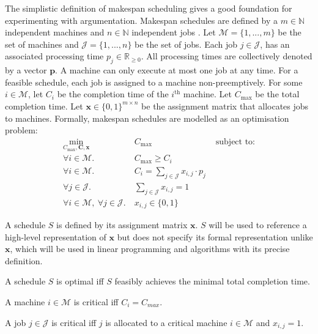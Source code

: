 The simplistic definition of makespan scheduling gives a good foundation for experimenting with argumentation. Makespan schedules are defined by a $m\in\mathbb{N}$ independent machines and $n\in\mathbb{N}$ independent jobs \cite{sa}. Let $\mathcal{M}=\{1,...,m\}$ be the set of machines and $\mathcal{J}=\{1,...,n\}$ be the set of jobs. Each job $j\in\mathcal{J}$, has an associated processing time $p_j\in\mathbb{R}_{\geq 0}$. All processing times are collectively denoted by a vector $\mathbf{p}$. A machine can only execute at most one job at any time. For a feasible schedule, each job is assigned to a machine non-preemptively. For some $i\in\mathcal{M}$, let $C_i$ be the completion time of the $i^\text{th}$ machine. Let $C_{\max}$ be the total completion time. Let $\mathbf{x}\in\{0,1\}^{m\times n}$ be the assignment matrix that allocates jobs to machines. Formally, makespan schedules are modelled as an optimisation problem:
\begin{align*}
	\min_{C_{\max},\mathbf{C},\mathbf{x}}\ &C_{\max}&\text{ subject to:}\\
	\forall i\in\mathcal{M}.\ &C_{\max}\geq C_i\\
	\forall i\in\mathcal{M}.\ &C_i=\sum_{j\in\mathcal{J}}x_{i,j}\cdot p_j\\
	\forall j\in\mathcal{J}.\ &\sum_{j\in\mathcal{J}}x_{i,j}=1\\
	\forall i\in\mathcal{M},\ \forall j\in\mathcal{J}.\ &x_{i,j}\in\{0,1\}
\end{align*}

\begin{definition}
	A schedule $S$ is defined by its assignment matrix $\mathbf{x}$. $S$ will be used to reference a high-level representation of $\mathbf{x}$ but does not specify its formal representation unlike $\mathbf{x}$, which will be used in linear programming and algorithms with its precise definition.
\end{definition}

\begin{definition}
	A schedule $S$ is optimal iff $S$ feasibly achieves the minimal total completion time.
\end{definition}

\begin{definition}
	A machine $i\in\mathcal{M}$ is critical iff $C_i=C_{max}$.
\end{definition}

\begin{definition}
	A job $j\in\mathcal{J}$ is critical iff $j$ is allocated to a critical machine $i\in\mathcal{M}$ and $x_{i,j}=1$.
\end{definition}

